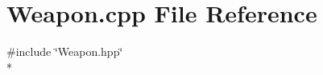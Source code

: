 \section{Weapon.\-cpp File Reference}
\label{_weapon_8cpp}
{\ttfamily \#include \char`\"{}Weapon.\-hpp\char`\"{}}\\*
